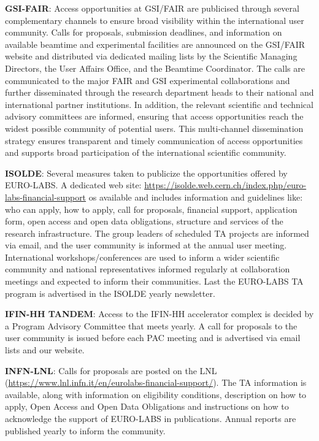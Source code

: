 \textbf{GSI-FAIR}: Access opportunities at GSI/FAIR are publicised through several complementary channels to ensure broad visibility within the international user community. Calls for proposals, submission deadlines, and information on available beamtime and experimental facilities are announced on the GSI/FAIR website and distributed via dedicated mailing lists by the Scientific Managing Directors, the User Affairs Office, and the Beamtime Coordinator. The calls are communicated to the major FAIR and GSI experimental collaborations and further disseminated through the research department heads to their national and international partner institutions. In addition, the relevant scientific and technical advisory committees are informed, ensuring that access opportunities reach the widest possible community of potential users. This multi-channel dissemination strategy ensures transparent and timely communication of access opportunities and supports broad participation of the international scientific community.

\textbf{ISOLDE}: Several measures taken to publicize the opportunities offered by EURO-LABS. A dedicated web site: \url{https://isolde.web.cern.ch/index.php/euro-labs-financial-support} os available and includes information and guidelines like: who can apply, how to apply, call for proposals, financial support, application form, open access and open data obligations, structure and services of the research infrastructure. The group leaders of scheduled TA projects are informed via email, and the user community is informed at the annual user meeting. International workshops/conferences are used to inform a wider scientific community and national representatives informed regularly at collaboration meetings and expected to inform their communities. Last the EURO-LABS TA program is advertised in the ISOLDE yearly newsletter.


\textbf{IFIN-HH TANDEM}: Access to the IFIN-HH accelerator complex is decided by a Program Advisory Committee that meets yearly. A call for proposals to the user community is issued before each PAC meeting and is advertised via email lists and our website.

\textbf{INFN-LNL}: Calls for proposals are posted on the LNL (\url{https://www.lnl.infn.it/en/eurolabs-financial-support/}).  The TA information is available, along with information on eligibility conditions, description on how to apply, Open Access and Open Data Obligations and instructions on how to acknowledge the support of EURO-LABS in publications. Annual reports are published yearly to inform the community.


